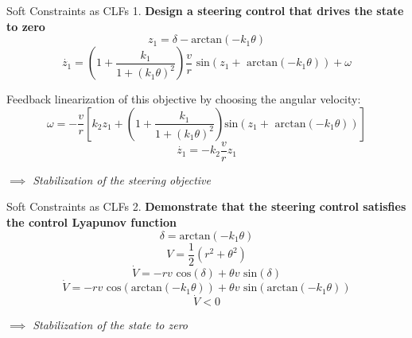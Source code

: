 \documentclass[10pt]{beamer}
\begin{document}
\begin{frame}{Soft Constraints as CLFs}
1. \textbf{Design a steering control that drives the state to zero}
$$z_1 = \delta - \text{arctan}(-k_1\theta)$$\pause
$$\dot{z_1}=\left( 1+\frac{k_1}{1+(k_1\theta)^2}\right) \frac{v}{r}\text{ sin}(z_1+\text{ arctan}(-k_1\theta))+\omega$$\pause


Feedback linearization of this objective by choosing the angular velocity: $$\omega = -\frac{v}{r}\left[ k_2 z_1+\left( 1 + \frac{k_1}{1+(k_1\theta)^2} \right) \text{sin}(z_1+\text{ arctan}(-k_1\theta))\right]$$\pause
$$ \dot{z_1}=-k_2\frac{v}{r}z_1 $$\begin{center}
\textit{$\implies$ Stabilization of the steering objective}\end{center}
\end{frame}

\begin{frame}{Soft Constraints as CLFs}
2. \textbf{Demonstrate that the steering control satisfies the control Lyapunov function}
$$\delta=\text{arctan}(-k_1\theta)$$\pause
$$V=\frac{1}{2}(r^2+\theta^2)$$\pause
$$\dot{V}=-r v \text{ cos}(\delta) + \theta v \text{ sin}(\delta)$$\pause
$$\dot{V}=-r v \text{ cos}(\text{arctan}(-k_1\theta)) + \theta v \text{ sin}(\text{arctan}(-k_1\theta))$$\pause
$$\dot{V}<0$$\begin{center}
\textit{$\implies$ Stabilization of the state to zero}\end{center}
\end{frame}
\end{document}
